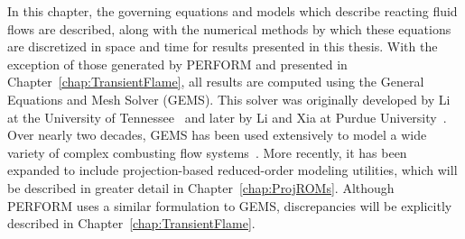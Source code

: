 
In this chapter, the governing equations and models which describe reacting fluid flows are described, along with the numerical methods by which these equations are discretized in space and time for results presented in this thesis. With the exception of those generated by PERFORM and presented in Chapter~\ref{chap:TransientFlame}, all results are computed using the General Equations and Mesh Solver (GEMS). This solver was originally developed by Li at the University of Tennessee~\cite{Li2001} and later by Li and Xia at Purdue University~\cite{Li2006}. Over nearly two decades, GEMS has been used extensively to model a wide variety of complex combusting flow systems~\cite{Xia2011,Huang2014,Comer2016}. More recently, it has been expanded to include projection-based reduced-order modeling utilities, which will be described in greater detail in Chapter~\ref{chap:ProjROMs}. Although PERFORM uses a similar formulation to GEMS, discrepancies will be explicitly described in Chapter~\ref{chap:TransientFlame}.